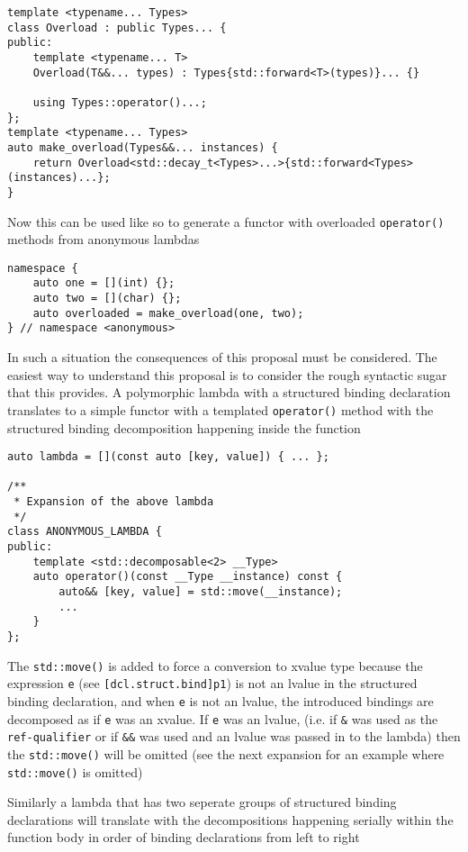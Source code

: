 \documentclass{article}
\begin{document}
\begin{lstlisting}
template <typename... Types>
class Overload : public Types... {
public:
    template <typename... T>
    Overload(T&&... types) : Types{std::forward<T>(types)}... {}

    using Types::operator()...;
};
template <typename... Types>
auto make_overload(Types&&... instances) {
    return Overload<std::decay_t<Types>...>{std::forward<Types>(instances)...};
}
\end{lstlisting}

Now this can be used like so to generate a functor with overloaded
\texttt{operator()} methods from anonymous lambdas

\begin{lstlisting}
namespace {
    auto one = [](int) {};
    auto two = [](char) {};
    auto overloaded = make_overload(one, two);
} // namespace <anonymous>
\end{lstlisting}

In such a situation the consequences of this proposal must be considered.  The
easiest way to understand this proposal is to consider the rough syntactic
sugar that this provides.  A polymorphic lambda with a structured binding
declaration translates to a simple functor with a templated
\texttt{operator()} method with the structured binding decomposition
happening inside the function

\begin{lstlisting}
auto lambda = [](const auto [key, value]) { ... };

/**
 * Expansion of the above lambda
 */
class ANONYMOUS_LAMBDA {
public:
    template <std::decomposable<2> __Type>
    auto operator()(const __Type __instance) const {
        auto&& [key, value] = std::move(__instance);
        ...
    }
};
\end{lstlisting}

The \texttt{std::move()} is added to force a conversion to xvalue type because
the expression \texttt{e} (see \texttt{[dcl.struct.bind]p1}) is not an lvalue
in the structured binding declaration, and when \texttt{e} is not an lvalue,
the introduced bindings are decomposed as if \texttt{e} was an xvalue.  If
\texttt{e} was an lvalue, (i.e.  if \texttt{\&} was used as the
\texttt{ref-qualifier} or if \texttt{\&\&} was used and an lvalue was passed in
to the lambda) then the \texttt{std::move()} will be omitted (see the next
expansion for an example where \texttt{std::move()} is omitted)

Similarly a lambda that has two seperate groups of structured binding
declarations will translate with the decompositions happening serially within
the function body in order of binding declarations from left to right
\end{document}
